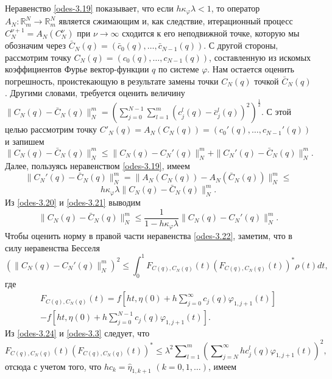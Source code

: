 Неравенство \eqref{odes-3.19} показывает, что если $h\kappa_\varphi\lambda<1$, то оператор  $A_N:\mathbb{R}^N_m\to \mathbb{R}^N_m$ является сжимающим и, как следствие, итерационный процесс $C_N^{\nu+1}=A_N(C_N^{\nu})$  при $\nu\to\infty$ сходится к его неподвижной точке, которую мы обозначим через  $\bar C_N(q)=(\bar c_0(q),\ldots,\bar c_{N-1}(q))$. С другой стороны, рассмотрим точку $C_N(q)=(c_0(q),\ldots,c_{N-1}(q))$, составленную из искомых коэффициентов Фурье вектор-функции $q$ по системе $\varphi$. Нам остается оценить погрешность, проистекающую в результате замены точки $C_N(q)$ точкой $\bar C_N(q)$. Другими словами, требуется оценить величину
$\|C_N(q)-\bar C_N(q)\|_N^m= \left(\sum_{j=0}^{N-1}\sum\nolimits_{l=1}^m(c_j^l(q)-\bar c_j^l(q))^2\right)^\frac12$. С этой целью рассмотрим точку $C'_N(q)=A_N(C_N(q))=(c_0'(q),\ldots,c_{N-1}'(q))$ и запишем
\begin{equation}\label{odes-3.20}
\|C_N(q)-\bar C_N(q)\|_N^m\le \|C_N(q)- C_N'(q)\|_N^m+\|C_N'(q)-\bar C_N(q)\|_N^m.
\end{equation}
Далее, пользуясь неравенством \eqref{odes-3.19}, имеем
$$
\|C_N'(q)-\bar C_N(q)\|_N^m=\|A_N(C_N(q))-A_N(\bar C_N(q))\|_N^m\le
$$
\begin{equation}\label{odes-3.21}
h\kappa_\varphi\lambda\|C_N(q)-\bar C_N(q)\|_N^m.
\end{equation}
Из \eqref{odes-3.20} и \eqref{odes-3.21} выводим
\begin{equation}\label{odes-3.22}
\|C_N(q)-\bar C_N(q)\|_N^m\le \frac1{1-h\kappa_\varphi\lambda}\|C_N(q)- C_N'(q)\|_N^m.
\end{equation}
Чтобы оценить норму в правой части неравенства \eqref{odes-3.22}, заметим, что в силу неравенства Бесселя
\begin{equation}\label{odes-3.23}
(\|C_N(q)- C_N'(q)\|_N^m)^2\le \int_{0}^1F_{C(q),C_N(q)}(t)(F_{C(q),C_N(q)}(t))^*\rho(t) dt,
\end{equation}
где
\begin{multline}\label{odes-3.24}
 F_{C(q),C_N(q)}(t)=f\left[ht,\eta(0)+ h\sum\nolimits_{j=0}^\infty c_j(q)\varphi_{1,j+1}(t)\right] \\
  -f\left[ht,\eta(0)+ h\sum\nolimits_{j=0}^{N-1}c_j(q)\varphi_{1,j+1}(t)\right].
\end{multline}
Из \eqref{odes-3.24} и \eqref{odes-3.3} следует, что
$$
F_{C(q),C_N(q)}(t)(F_{C(q),C_N(q)}(t))^*\le \lambda^2 \sum\nolimits_{l=1}^m  \left(\sum\nolimits_{j=N}^\infty hc_j^l(q)\varphi_{1,j+1}(t)\right)^2,
$$
отсюда с учетом того, что $hc_k=\hat \eta_{1,k+1}$ $(k=0,1,\ldots)$, имеем
